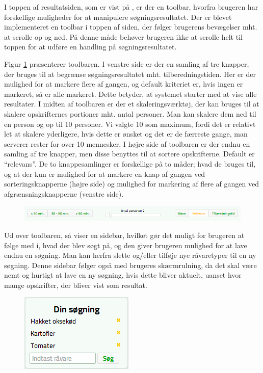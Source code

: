 I toppen af resultatsiden, som er vist på , er der en toolbar, hvorfra brugeren har forskellige muligheder for at manipulere søgningsresultatet. Der er blevet implementeret en toolbar i toppen af siden, der følger brugerens bevægelser mht. at scrolle op og ned. På denne måde behøver brugeren ikke at scrolle helt til toppen for at udføre en handling på søgningsresultatet. 

Figur \ref{fig:foodl-toolbar} præsenterer toolbaren. I venstre side er der en samling af tre knapper, der bruges til at begrænse søgningsresultatet mht. tilberedningstiden. Her er der mulighed for at markere flere af gangen, og default kriteriet er, hvis ingen er markeret, så er alle markeret. Dette betyder, at systemet starter med at vise alle resultater. 
I midten af toolbaren er der et skaleringsværktøj, der kan bruges til at skalere opskrifternes portioner mht. antal personer. Man kan skalere dem ned til en person og op til 10 personer. Vi valgte 10 som maximum, fordi det er relativt let at skalere yderligere, hvis dette er ønsket og det er de færreste gange, man serverer rester for over 10 mennesker.
I højre side af toolbaren er der endnu en samling af tre knapper, men disse benyttes til at sortere opskrifterne. Default er ``relevans''. De to knappesamlinger er forskellige på to måder; hvad de bruges til, og at der kun er mulighed for at markere en knap af gangen ved sorteringsknapperne (højre side) og mulighed for markering af flere af gangen ved afgrænsningsknapperne (venstre side).

\begin{figure}[H]
	\centering
	\includegraphics[scale=0.5]{billeder/foodl/toolbar.png}
	\label{fig:foodl-toolbar}
\end{figure}

Ud over toolbaren, så viser  en sidebar, hvilket gør det muligt for brugeren at følge med i, hvad der blev søgt på, og den giver brugeren mulighed for at lave endnu en søgning. Man kan herfra slette og/eller tilføje nye råvaretyper til en ny søgning. Denne sidebar følger også med brugeres skærmrulning, da det skal være nemt og hurtigt at lave en ny søgning, hvis dette bliver aktuelt, uanset hvor mange opskrifter, der bliver vist som resultat.

\begin{figure}[H]
	\centering
	\includegraphics[scale=0.5]{billeder/foodl/sidebar.png}
	\label{fig:foodl-sidebar}
\end{figure}

